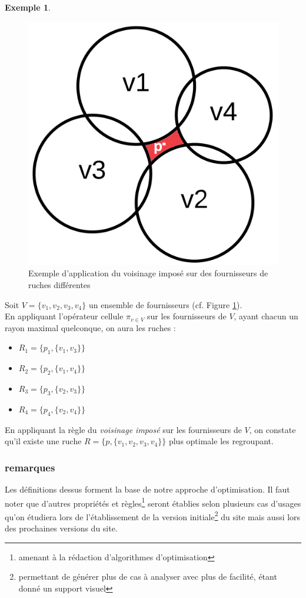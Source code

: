 \documentclass[a4paper,12pt]{report}
\theoremstyle{break}
\theoremstyle{break}
\theoremstyle{break}
\theoremstyle{break}
\theoremstyle{definition}
\newtheorem*{example}{Exemple}
\theoremstyle{remark}
\begin{document}
\begin{example}
\begin{figure}
  \centering
  \includegraphics[scale=0.15]{images/exemple_introductif2.png}
  \caption{Exemple d'application du voisinage imposé sur des fournisseurs de ruches différentes}
  \label{fig:exemple_introductif_2}
\end{figure}

Soit $V = \{v_1, v_2, v_3, v_4\}$ un ensemble de fournisseurs (cf. Figure \ref{fig:exemple_introductif_2}).\\
En appliquant l'opérateur cellule $\pi_{v \in V}$ sur les fournisseurs de $V$, ayant chacun un rayon maximal quelconque, on aura les ruches :
\begin{itemize}
  \item{$R_1 = \{p_1, \{v_1, v_3\}\}$}
  \item{$R_2 = \{p_2, \{v_1, v_4\}\}$}
  \item{$R_3 = \{p_3, \{v_2, v_3\}\}$}
  \item{$R_4 = \{p_4, \{v_2, v_4\}\}$}
\end{itemize}
En appliquant la règle du \textit{voisinage imposé} sur les fournisseurs de $V$, on constate qu'il existe une ruche $R=\{p, \{v_1, v_2, v_3, v_4\}\}$ plus optimale les regroupant.
\end{example}

\subsubsection{remarques}
Les définitions dessus forment la base de notre approche d'optimisation. Il faut noter que d'autres propriétés et règles\footnote{amenant à la rédaction d'algorithmes d'optimisation} seront établies selon plusieurs cas d'usages qu'on étudiera lors de l'établissement de la version initiale\footnote{permettant de générer plus de cas à analyser avec plus de facilité, étant donné un support visuel} du site mais aussi lors des prochaines versions du site.
\end{document}
